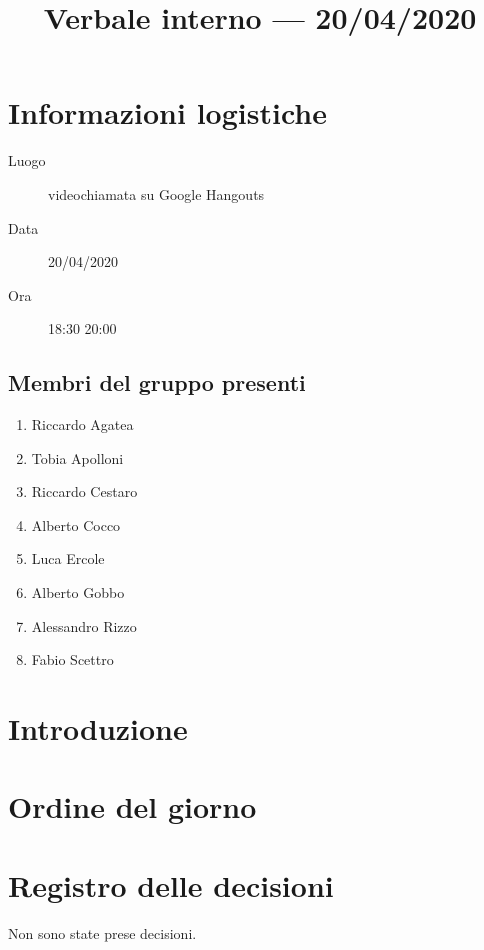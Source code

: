 \documentclass{article}
\title{Verbale interno --- 20/04/2020}
\begin{document}


\section{Informazioni logistiche}%
\label{sec:informazioni_logistiche}

\begin{description}
  \item [Luogo] videochiamata su Google Hangouts
  \item [Data] 20/04/2020
  \item [Ora] 18:30  20:00
\end{description}

\subsection{Membri del gruppo presenti}%
\label{sub:membri_del_gruppo_presenti}

\begin{enumerate}
  \item Riccardo Agatea
  \item Tobia Apolloni
  \item Riccardo Cestaro
  \item Alberto Cocco
  \item Luca Ercole
  \item Alberto Gobbo
  \item Alessandro Rizzo
  \item Fabio Scettro
\end{enumerate}

\section{Introduzione}%
\label{sec:introduzione}

\section{Ordine del giorno}%
\label{sec:ordine_del_giorno}

\newpage
\section{Registro delle decisioni}%
\label{sec:registro_delle_decisioni}

Non sono state prese decisioni.

\end{document}
